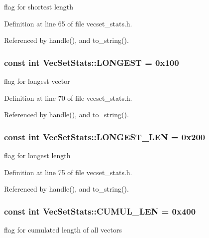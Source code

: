 flag for shortest length 

Definition at line 65 of file vecset\_\-stats.h.

Referenced by handle(), and to\_\-string().\hypertarget{class_vec_set_stats_0be7215a7373552c5fabd78881735003}{
\subsubsection[LONGEST]{\setlength{\rightskip}{0pt plus 5cm}const int {\bf VecSetStats::LONGEST} = 0x100}}
\label{class_vec_set_stats_0be7215a7373552c5fabd78881735003}


flag for longest vector 

Definition at line 70 of file vecset\_\-stats.h.

Referenced by handle(), and to\_\-string().\hypertarget{class_vec_set_stats_6fcd640961e61b328785f8c030e30181}{
\subsubsection[LONGEST\_\-LEN]{\setlength{\rightskip}{0pt plus 5cm}const int {\bf VecSetStats::LONGEST\_\-LEN} = 0x200}}
\label{class_vec_set_stats_6fcd640961e61b328785f8c030e30181}


flag for longest length 

Definition at line 75 of file vecset\_\-stats.h.

Referenced by handle(), and to\_\-string().\hypertarget{class_vec_set_stats_8fe79d213b693917d14bcacd86ff62aa}{
\subsubsection[CUMUL\_\-LEN]{\setlength{\rightskip}{0pt plus 5cm}const int {\bf VecSetStats::CUMUL\_\-LEN} = 0x400}}
\label{class_vec_set_stats_8fe79d213b693917d14bcacd86ff62aa}


flag for cumulated length of all vectors 

